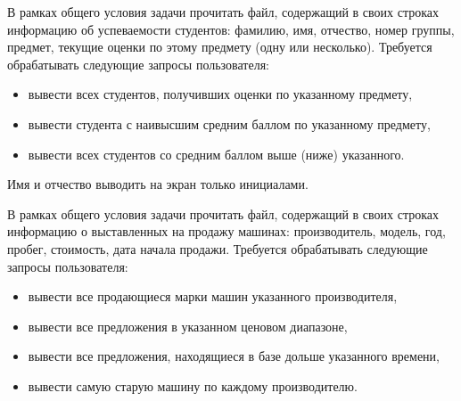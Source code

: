 \begin{zztask}
В рамках общего условия задачи прочитать файл, содержащий в своих строках
информацию об успеваемости студентов: фамилию, имя, отчество, номер группы,
предмет, текущие оценки по этому предмету (одну или несколько). Требуется
обрабатывать следующие запросы пользователя:
%
\begin{itemize}
\item вывести всех студентов, получивших оценки по указанному предмету,
\item вывести студента с наивысшим средним баллом по указанному предмету,
\item вывести всех студентов со средним баллом выше (ниже) указанного.
\end{itemize}
%
Имя и отчество выводить на экран только инициалами.
\end{zztask}


\begin{zztask}
В рамках общего условия задачи прочитать файл, содержащий в своих строках
информацию о выставленных на продажу машинах: производитель, модель, год,
пробег, стоимость, дата начала продажи. Требуется обрабатывать следующие
запросы пользователя:
%
\begin{itemize}
\item вывести все продающиеся марки машин указанного производителя,
\item вывести все предложения в указанном ценовом диапазоне,
\item вывести все предложения, находящиеся в базе дольше указанного времени,
\item вывести самую старую машину по каждому производителю.
\end{itemize}
\end{zztask}


